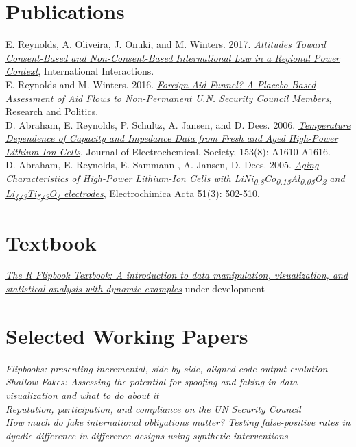 \documentclass[margin, 10pt]{CVStyleTemplate}\usepackage[]{graphicx}\usepackage[]{color}
\begin{document}
\begin{resume}
\section{Publications}

E. Reynolds, A. Oliveira, J. Onuki,
 and M. Winters. 2017. \emph{\href{http://www.tandfonline.com/doi/abs/10.1080/03050629.2018.1408012}{Attitudes Toward Consent-Based and Non-Consent-Based International Law in a Regional Power Context}}, International Interactions.\\[6pt]
E. Reynolds and M. Winters. 2016. \emph{\href{http://rap.sagepub.com/content/3/1/2053168015626167}{Foreign Aid Funnel? A Placebo-Based Assessment of Aid Flows to Non-Permanent U.N. Security Council Members}}, Research and Politics. \\[6pt]%
D. Abraham, E. Reynolds, P. Schultz, A. Jansen, and D. Dees. 2006. \emph{\href{http://jes.ecsdl.org/content/153/8/A1610.abstract}{Temperature Dependence of Capacity and Impedance Data from Fresh and Aged High-Power Lithium-Ion Cells}}, Journal of Electrochemical. Society, 153(8): A1610-A1616. \\[6pt]%
D. Abraham, E. Reynolds, E. Sammann , A. Jansen,  D. Dees. 2005. \emph{\href{http://www.sciencedirect.com/science/article/pii/S0013468605004433}{Aging Characteristics of High-Power Lithium-Ion Cells with LiNi\textsubscript{0.8}Co\textsubscript{0.15}Al\textsubscript{0.05}O\textsubscript{2} and Li\textsubscript{4/3}Ti\textsubscript{5/3}O\textsubscript{4} electrodes}}, Electrochimica Acta 51(3): 502-510.%

\section{Textbook}

\emph{\href{https://evamaerey.github.io/flipbooks/textbook}{The R Flipbook Textbook: A introduction to data manipulation, visualization, and statistical analysis with dynamic examples}} under development


\section{Selected Working Papers}


\emph{Flipbooks: presenting incremental, side-by-side, aligned code-output evolution}\\[6pt]
\emph{Shallow Fakes: Assessing the potential for spoofing and faking in data visualization and what to do about it}\\[6pt]
\emph{Reputation, participation, and compliance on the UN Security Council}\\[6pt]
\emph{How much do \emph{fake} international obligations matter?  Testing false-positive rates in dyadic difference-in-difference designs using synthetic interventions}\\[6pt]


\end{resume}
\end{document}
